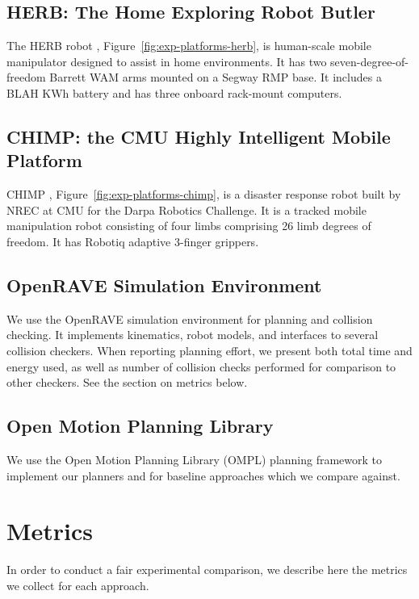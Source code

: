 \subsection*{HERB: The Home Exploring Robot Butler}

The HERB robot \cite{srinivasa2012herb20},
Figure~\ref{fig:exp-platforms-herb},
is human-scale mobile manipulator designed to assist in home
environments.
It has two seven-degree-of-freedom Barrett WAM arms mounted
on a Segway RMP base.
It includes a BLAH KWh battery and has three onboard rack-mount
computers.

\subsection*{CHIMP: the CMU Highly Intelligent Mobile Platform}

CHIMP \cite{stentz2014chimp},
Figure~\ref{fig:exp-platforms-chimp},
is a disaster response robot built by NREC at CMU
for the Darpa Robotics Challenge.
It is a tracked mobile manipulation robot consisting of
four limbs comprising 26 limb degrees of freedom.
It has Robotiq adaptive 3-finger grippers.

\subsection*{OpenRAVE Simulation Environment}

We use the OpenRAVE \cite{diankov2010openrave} simulation environment
for planning and collision checking.
It implements kinematics, robot models,
and interfaces to several collision checkers.
When reporting planning effort,
we present both total time and energy used,
as well as number of collision checks performed
for comparison to other checkers.
See the section on metrics below.

\subsection*{Open Motion Planning Library}

We use the Open Motion Planning Library (OMPL)
planning framework \cite{sucan2012ompl}
to implement our planners
and for baseline approaches which we compare against.

\section{Metrics}

In order to conduct a fair experimental comparison,
we describe here the metrics we collect for each approach.


